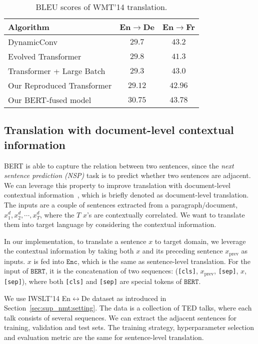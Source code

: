 \documentclass{article} \usepackage{iclr2020_conference,times}
\newcommand{\bert}{\texttt{BERT}}
\newcommand{\enc}{\texttt{Enc}}
\begin{document}
\begin{table}[!htbp]
\centering
\caption{BLEU scores of WMT'14 translation.}
\begin{tabular}{lcc}
\toprule
Algorithm & En$\to$De & En$\to$Fr \\
\midrule
DynamicConv~\citep{wu2019pay} & $29.7$ & $43.2$ \\
Evolved Transformer~\citep{so2019evolved} & $29.8$ & $41.3$ \\
\midrule
Transformer + Large Batch~\citep{ott2018scaling} & $29.3$ & $43.0$ \\
Our Reproduced  Transformer & $29.12$ & $42.96$ \\
Our BERT-fused model & $30.75$ & $43.78$ \\
\bottomrule
\end{tabular}
\label{tab:results_wmt_en-de}
\end{table}



\subsection{Translation with document-level contextual information}
BERT is able to capture the relation between two sentences, since the {\em next sentence prediction (NSP)} task is to predict whether two sentences are adjacent. We can leverage this property to improve translation with document-level contextual information~\citep{miculicich2018document}, which is briefly denoted as document-level translation. The inputs are a couple of sentences extracted from a paragraph/document, $x_1^d,x_2^d,\cdots,x_T^d$, where the $T$ $x$'s are contextually correlated. We want to translate them into target language by considering the contextual information.

 In our implementation, to translate a sentence $x$ to target domain, we leverage the contextual information by taking both $x$ and its preceding sentence $x_{\text{prev}}$ as inputs. $x$ is fed into $\enc$, which is the same as sentence-level translation. For the input of $\bert$, it is the concatenation of two sequences: (\texttt{[cls]}, $x_{\text{prev}}$, \texttt{[sep]}, $x$, \texttt{[sep]}), where both \texttt{[cls]} and \texttt{[sep]} are special tokens of $\bert$. 

 We use IWSLT'14 En$\leftrightarrow$De dataset as introduced in Section~\ref{sec:sup_nmt:setting}. The data is a collection of TED talks, where each talk consists of several sequences. We can extract the adjacent sentences for training, validation and test sets. The training strategy, hyperparameter selection and evaluation metric are the same for sentence-level translation. 
\end{document}
